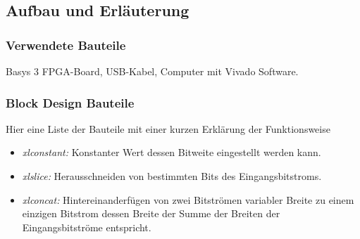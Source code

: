 \documentclass[11pt, a4paper]{article}
\begin{document}
\subsection*{Aufbau und Erläuterung}
\subsubsection*{Verwendete Bauteile}
Basys 3 FPGA-Board, USB-Kabel, Computer mit Vivado Software.
\subsubsection*{Block Design Bauteile}
Hier eine Liste der Bauteile mit einer kurzen Erklärung der Funktionsweise
\begin{itemize}
	\item \textit{xlconstant:} Konstanter Wert dessen Bitweite eingestellt werden kann.
	\item \textit{xlslice:} Herausschneiden von bestimmten Bits des Eingangsbitstroms.
	\item \textit{xlconcat:} Hintereinanderfügen von zwei Bitströmen variabler Breite zu einem einzigen Bitstrom dessen Breite der Summe der Breiten der Eingangsbitströme entspricht.
\end{itemize}
\end{document}
